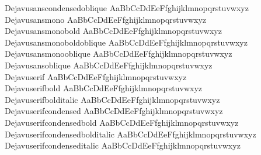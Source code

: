 \begin{tabbing}
Dejavusanscondensedoblique \> { AaBbCcDdEeFfghijklmnopqrstuvwxyz} \\
Dejavusansmono \> { AaBbCcDdEeFfghijklmnopqrstuvwxyz} \\
Dejavusansmonobold \> { AaBbCcDdEeFfghijklmnopqrstuvwxyz} \\
Dejavusansmonoboldoblique \> { AaBbCcDdEeFfghijklmnopqrstuvwxyz} \\
Dejavusansmonooblique \> { AaBbCcDdEeFfghijklmnopqrstuvwxyz} \\
Dejavusansoblique \> { AaBbCcDdEeFfghijklmnopqrstuvwxyz} \\
Dejavuserif \> { AaBbCcDdEeFfghijklmnopqrstuvwxyz} \\
Dejavuserifbold \> { AaBbCcDdEeFfghijklmnopqrstuvwxyz} \\
Dejavuserifbolditalic \> { AaBbCcDdEeFfghijklmnopqrstuvwxyz} \\
Dejavuserifcondensed \> { AaBbCcDdEeFfghijklmnopqrstuvwxyz} \\
Dejavuserifcondensedbold \> { AaBbCcDdEeFfghijklmnopqrstuvwxyz} \\
Dejavuserifcondensedbolditalic \> { AaBbCcDdEeFfghijklmnopqrstuvwxyz} \\
Dejavuserifcondenseditalic \> { AaBbCcDdEeFfghijklmnopqrstuvwxyz} \\

\end{tabbing}

